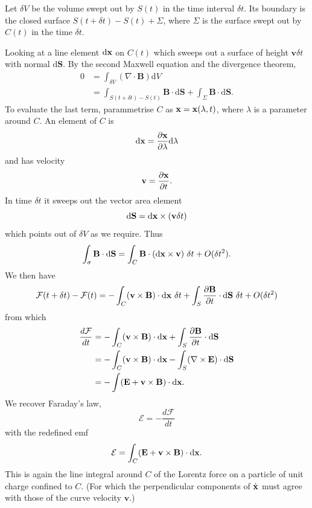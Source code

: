 \documentclass{article}
\begin{document}
Let $ \delta V $ be the volume swept out by $ S(t) $ in the time interval $ \delta t $. Its boundary is the closed surface $ S(t+\delta t) - S(t) + \Sigma $, where $ \Sigma $ is the surface swept out by $ C(t) $ in the time $ \delta t $.
\par
Looking at a line element $ \mathrm d \mathbf{x} $ on $ C(t) $ which sweeps out a surface of height $ \mathbf v \delta t $ with normal $ \mathrm d\mathbf S $. By the second Maxwell equation and the divergence theorem,
\begin{align*}
   0 &= \int_{\delta V} (\nabla\cdot\mathbf B)\mathrm dV \\
     &= \int_{S(t+\delta t)-S(t)} \mathbf B\cdot\mathrm d\mathbf S + \int_\Sigma \mathbf B \cdot\mathrm d \mathbf S.
\end{align*}
To evaluate the last term, parammetrise $ C $ as $ \mathbf{x} = \mathbf{x}(\lambda,t) $, where $ \lambda $ is a parameter around $ C $. An element of $ C $ is
\begin{align*}
	\mathrm d\mathbf{x} = \frac{\partial \mathbf{x}} {\partial \lambda}\mathrm d\lambda
\end{align*}
and has velocity
\[
	\mathbf v = \frac{\partial \mathbf{x}}{\partial t}.
\]
In time $ \delta t $ it sweeps out the vector area element
\[
  \mathrm d \mathbf S = \mathrm d \mathbf{x} \times (\mathbf v \delta t)
\]
which points out of $ \delta V $ as we require. Thus 
\[
  \int_\sigma \mathbf B\cdot\mathrm d\mathbf S = \int_C \mathbf B \cdot (\mathrm d\mathbf{x} \times \mathbf v)\ \delta t +O(\delta t^2). 
\]
We then have
\[
	\mathcal F(t+\delta t) - \mathcal F(t) = -\int_C (\mathbf v \times \mathbf B)\cdot\mathrm d\mathbf{x} \ \delta t +\int_S \frac{\partial \mathbf B}{\partial t} \cdot\mathrm d \mathbf S \ \delta t + O(\delta t^2)
\]
from which
\begin{align*}
	\frac{d\mathcal F}{dt} &= -\int_C (\mathbf v \times \mathbf B)\cdot\mathrm d \mathbf{x} + \int_S \frac{\partial \mathbf B}{\partial t}\cdot\mathrm d \mathbf S\\
			       &= -\int_C(\mathbf v\times \mathbf B)\cdot\mathrm d\mathbf{x} - \int_S (\nabla\times \mathbf E) \cdot\mathrm d \mathbf S\\
			       &= -\int (\mathbf E +\mathbf v \times \mathbf B)\cdot\mathrm d\mathbf{x}.
\end{align*}
We recover Faraday's law,
\[
	\mathcal E = -\frac{d\mathcal F}{dt}
\]
with the redefined emf
\[
  \mathcal E = \int_C (\mathbf E +\mathbf v \times \mathbf B)\cdot \mathrm d \mathbf{x}.
\]
This is again the line integral around $ C $ of the Lorentz force on a particle of unit charge confined to $ C $. (For which the perpendicular components of $ \dot{\mathbf{x}} $ must agree with those of the curve velocity $ \mathbf v $.)
\end{document}
